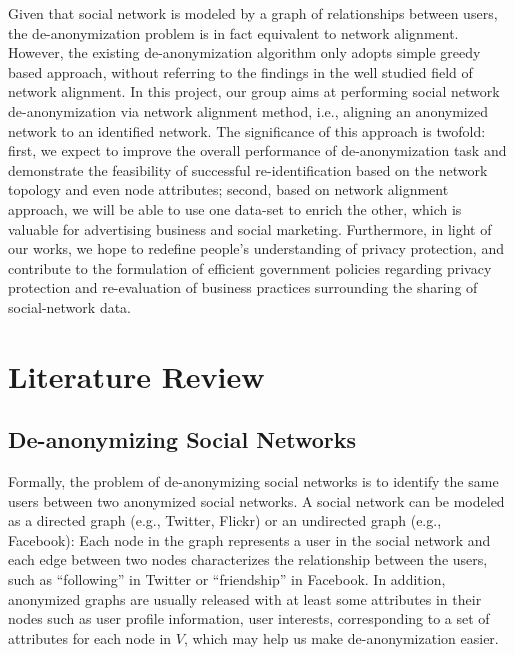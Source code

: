 \documentclass[11pt,letterpaper]{article}
\begin{document}
Given that social network is modeled by a graph of relationships between users, the de-anonymization problem is in fact equivalent to network alignment. However, the existing de-anonymization algorithm \cite{Narayanan2009} only adopts simple greedy based approach, without referring to the findings in the well studied field of network alignment. In this project, our group aims at performing social network de-anonymization via network alignment method, i.e., aligning an anonymized network to an identified network. The significance of this approach is twofold: first, we expect to improve the overall performance of de-anonymization task and demonstrate the feasibility of successful re-identiﬁcation based on the network topology and even node attributes; second, based on network alignment approach, we will be able to use one data-set to enrich the other, which is valuable for advertising business and social marketing. Furthermore, in light of our works, we hope to redefine people's understanding of privacy protection, and contribute to the formulation of efficient government policies regarding privacy protection and re-evaluation of business practices surrounding the sharing of social-network data.


\section{Literature Review}

\subsection{De-anonymizing Social Networks}

Formally, the problem of de-anonymizing social networks is to identify the same users between two anonymized social networks.  A social network can be modeled as a directed graph (e.g., Twitter, Flickr) or an undirected graph (e.g., Facebook): Each node in the graph represents a user in the social network and each edge between two nodes characterizes the relationship between the users, such as ``following'' in Twitter or ``friendship'' in Facebook. In addition, anonymized graphs are usually released with at least some attributes in their nodes such as user profile information, user interests, corresponding to a set of attributes for each node in $V$, which may help us make de-anonymization easier.
\end{document}
